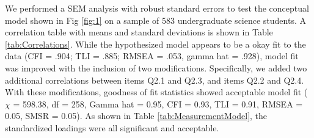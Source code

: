 We performed a SEM analysis with robust standard errors to test the conceptual model shown in Fig \ref{fig:1} on a sample of 583 undergraduate science students. A correlation table with means and standard deviations is shown in Table \ref{tab:Correlations}. While the hypothesized model appears to be a okay fit to the data (CFI = .904; TLI = .885;  RMSEA = .053, gamma hat =  .928), model fit was improved with the inclusion of two modifications. Specifically, we added two additional correlations between items Q2.1 and Q2.3, and items Q2.2 and Q2.4. With these modifications, goodness of fit statistics showed acceptable model fit \cite{hu1999cutoff,steiger2007understanding} ($\chi$ = 598.38, df = 258, Gamma hat = 0.95, CFI = 0.93, TLI = 0.91, RMSEA = 0.05, SMSR = 0.05). As shown in Table \ref{tab:MeasurementModel}, the standardized loadings were all significant and acceptable. 




